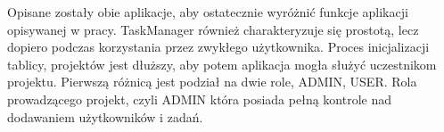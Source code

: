\indent Opisane zostały obie aplikacje, aby ostatecznie wyróżnić funkcje aplikacji opisywanej w pracy. TaskManager również charakteryzuje się prostotą, lecz dopiero podczas korzystania przez zwykłego użytkownika. Proces inicjalizacji tablicy, projektów jest dłuższy, aby potem aplikacja mogła służyć uczestnikom projektu.
Pierwszą różnicą jest podział na dwie role, ADMIN, USER. Rola prowadzącego projekt, czyli ADMIN która posiada pełną kontrole nad dodawaniem użytkowników i zadań.




